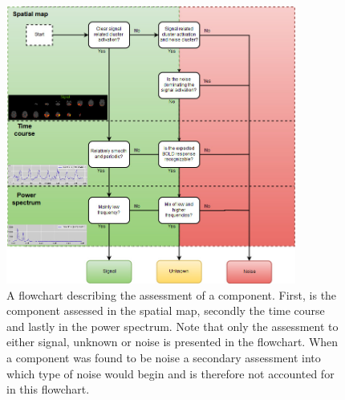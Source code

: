  \begin{figure}[H]                 
 	\includegraphics[width=0.85\textwidth]{figures/bMethods/Hand_labeling}  
 	\caption{A flowchart describing the assessment of a component. First, is the component assessed in the spatial map, secondly the time course and lastly in the power spectrum. Note that only the assessment to either signal, unknown or noise is presented in the flowchart. When a component was found to be noise a secondary assessment into which type of noise would begin and is therefore not accounted for in this flowchart.}
 	\label{fig:hand_label} 
 \end{figure}
